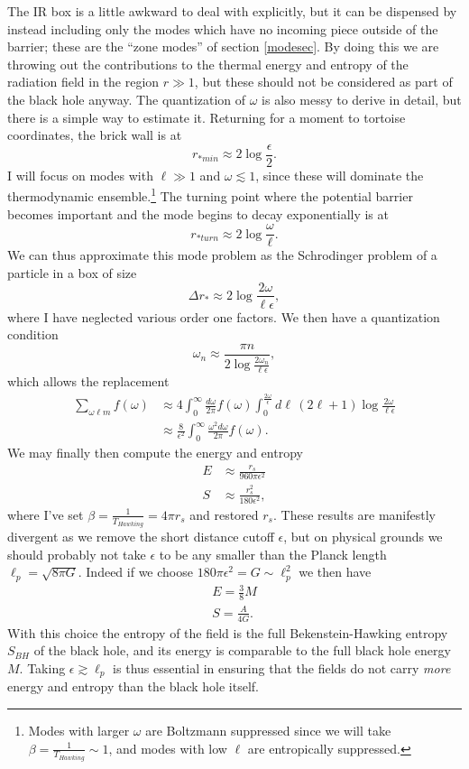 \documentclass[12pt]{article}
\newcommand{\be}{\begin{equation}}
\newcommand{\ee}{\end{equation}}
\begin{document}
The IR box is a little awkward to deal with explicitly, but it can be dispensed by instead including only the modes which have no incoming piece outside of the barrier; these are the ``zone modes'' of section \ref{modesec}.  By doing this we are throwing out the contributions to the thermal energy and entropy of the radiation field in the region $r\gg 1$, but these should not be considered as part of the black hole anyway.  The quantization of $\omega$ is also messy to derive in detail, but there is a simple way to estimate it.  Returning for a moment to tortoise coordinates, the brick wall is at
\be
r_{*min}\approx 2\log\frac{\epsilon}{2}.
\ee
I will focus on modes with $\ell\gg 1$ and $\omega\lesssim 1$, since these will dominate the thermodynamic ensemble.\footnote{Modes with larger $\omega$ are Boltzmann suppressed since we will take $\beta=\frac{1}{T_{Hawking}}\sim 1$, and modes with low $\ell$ are entropically suppressed.}  The turning point where the potential barrier becomes important and the mode begins to decay exponentially is at
\be
r_{*turn}\approx 2\log \frac{\omega}{\ell}.
\ee
We can thus approximate this mode problem as the Schrodinger problem of a particle in a box of size
\be
\Delta r_*\approx 2\log \frac{2\omega}{\ell \epsilon},
\ee
where I have neglected various order one factors.  We then have a quantization condition
\be
\omega_n\approx \frac{\pi n}{2\log \frac{2\omega_n}{\ell\epsilon}},
\ee
which allows the replacement
\begin{align}\nonumber
\sum_{\omega \ell m}f(\omega)&\approx 4\int_0^\infty \frac{d\omega}{2\pi} f(\omega)\int_0^{\frac{2\omega}{\epsilon}} d\ell\,(2\ell+1) \log\frac{2\omega}{\ell\epsilon}\\
&\approx \frac{8}{\epsilon^2}\int_0^\infty \frac{\omega^2 d\omega}{2\pi}f(\omega).
\end{align}
We may finally then compute the energy and entropy
\begin{align}\nonumber
E&\approx \frac{r_s}{960\pi \epsilon^2}\\
S&\approx\frac{r_s^2}{180\epsilon^2},
\end{align}
where I've set $\beta=\frac{1}{T_{Hawking}}=4\pi r_s$ and restored $r_s$.  These results are manifestly divergent as we remove the short distance cutoff $\epsilon$, but on physical grounds we should probably not take $\epsilon$ to be any smaller than the Planck length $\ell_p=\sqrt{8\pi G}$. Indeed if we choose $180\pi \epsilon^2=G\sim \ell_p^2$ we then have
\begin{align}\nonumber
E=\frac{3}{8} M\\
S=\frac{A}{4G}.
\end{align}
With this choice the entropy of the field is the full Bekenstein-Hawking entropy $S_{BH}$ of the black hole, and its energy is comparable to the full black hole energy $M$.  Taking $\epsilon\gtrsim \ell_p$ is thus essential in ensuring that the fields do not carry \textit{more} energy and entropy than the black hole itself.  
\end{document}
